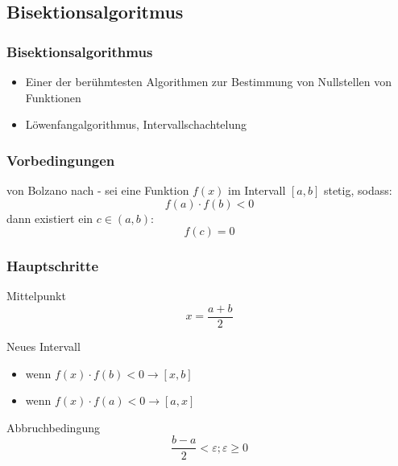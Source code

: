 \documentclass[table]{beamer}
\begin{document}
\subsection{Bisektionsalgoritmus}
\begin{frame}
\frametitle{Bisektionsalgorithmus}	
\begin{itemize}
\item Einer der berühmtesten Algorithmen zur Bestimmung von Nullstellen von Funktionen
\item Löwenfangalgorithmus, Intervallschachtelung
\end{itemize}

\end{frame}	
\begin{frame}
\frametitle{Vorbedingungen}
\begin{theorem}{von Bolzano nach \cite{bogomolny}}
- sei eine Funktion $f(x)$ im Intervall $[a,b]$ stetig, sodass:
$$f(a)\cdot f(b)<0$$ dann existiert ein $c \in (a,b)$:
$$f(c)=0$$

\end{theorem}

\end{frame}
\begin{frame}
\frametitle{Hauptschritte}
\begin{block}{Mittelpunkt}
$$x=\frac{a+b}{2}$$
\end{block}
\begin{block}{Neues Intervall}
\begin{itemize}
\item wenn $f(x)\cdot f(b)<0 \to [x,b]$
\item wenn $f(x)\cdot f(a)< 0\to [a,x]$
\end{itemize}
\end{block}
\begin{block}{Abbruchbedingung}
$$\frac{b-a}{2}<\varepsilon ;   \varepsilon \geq 0$$
\end{block}
\end{frame}
\end{document}
